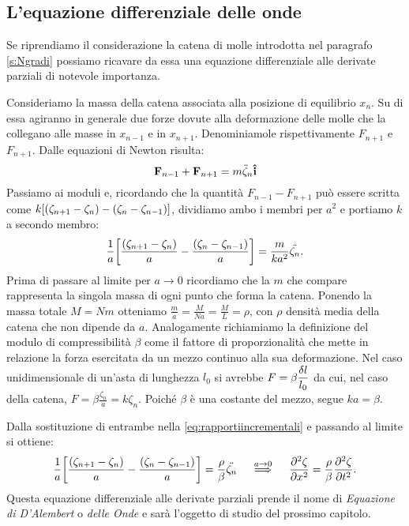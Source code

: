     \subsection{L'equazione differenziale delle onde}
        Se riprendiamo il considerazione la catena di molle introdotta nel paragrafo \ref{s:Ngradi} possiamo ricavare da essa una equazione differenziale alle derivate parziali di notevole importanza.
        \par Consideriamo la massa della catena associata alla posizione di equilibrio $x_n$. Su di essa agiranno in generale due forze dovute alla deformazione delle molle che la collegano alle masse in $x_{n-1}$ e in $x_{n+1}$. Denominiamole rispettivamente $F_{n+1}$ e $F_{n+1}$. Dalle equazioni di Newton risulta:
            $$\vb{F}_{n-1}+\vb{F}_{n+1}=m\ddot{\zeta}_n\vu{i}$$
        Passiamo ai moduli e, ricordando che la quantit\`a $F_{n-1}-F_{n+1}$ pu\`o essere scritta come $k\qty[\qty(\zeta_{n+1}-\zeta_n)-\qty(\zeta_{n}-\zeta_{n-1})]$, dividiamo ambo i membri per $a^2$ e portiamo $k$ a secondo membro:
        \begin{equation}
            \frac{1}{a}\qty[\frac{\qty(\zeta_{n+1}-\zeta_n)}{a}-\frac{\qty(\zeta_{n}-\zeta_{n-1})}{a}]=\frac{m}{ka^2}\ddot{\zeta_n}.
            \label{eq:rapportiincrementali}
        \end{equation}
        Prima di passare al limite per $a\to 0$ ricordiamo che la $m$ che compare rappresenta la singola massa di ogni punto che forma la catena. Ponendo la massa totale $M=Nm$ otteniamo $\displaystyle\frac{m}{a}=\frac{M}{Na}=\frac{M}{L}=\rho$, con $\rho$ densit\`a media della catena che non dipende da $a$. Analogamente richiamiamo la definizione del modulo di compressibilit\`a $\beta$ come il fattore di proporzionalit\`a che mette in relazione la forza esercitata da un mezzo continuo alla sua deformazione. Nel caso unidimensionale di un'asta di lunghezza $l_0$ si avrebbe $\displaystyle F=\beta\frac{\var{l}}{l_0}$ da cui, nel caso della catena, $\displaystyle F=\beta\frac{\zeta_n}{a}=k\zeta_n$. Poich\'e $\beta$ \`e una costante del mezzo, segue $ka=\beta$.
        \par Dalla sostituzione di entrambe nella \eqref{eq:rapportiincrementali} e passando al limite si ottiene:
        \begin{equation}
            \frac{1}{a}\qty[\frac{\qty(\zeta_{n+1}-\zeta_n)}{a}-\frac{\qty(\zeta_{n}-\zeta_{n-1})}{a}]=\frac{\rho}{\beta}\ddot{\zeta_n}\quad\overset{a\to 0}{\implies}\quad\pdv[2]{\zeta}{x}=\frac{\rho}{\beta}\pdv[2]{\zeta}{t}.
        \end{equation}
        Questa equazione differenziale alle derivate parziali prende il nome di \emph{Equazione di D'Alembert} o \emph{delle Onde} e sar\`a l'oggetto di studio del prossimo capitolo.